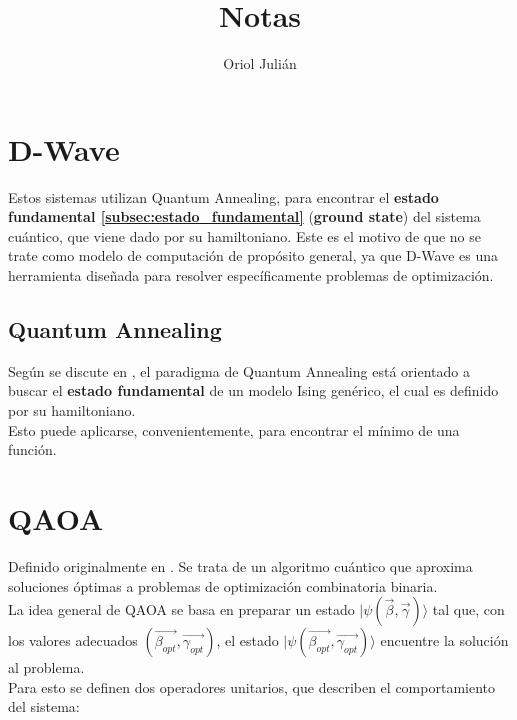 \documentclass{article}
\title{Notas}
\author{Oriol Julián}
\begin{document}
\maketitle{}
\tableofcontents{}

\newpage
\section{D-Wave}
\label{sec:dwave}

Estos sistemas utilizan Quantum Annealing, para encontrar el \textbf{estado fundamental \ref{subsec:estado_fundamental}} (\textbf{ground state}) del sistema cuántico, que viene dado por su hamiltoniano.
Este es el motivo de que no se trate como modelo de computación de propósito general, ya que D-Wave es una herramienta diseñada para resolver específicamente problemas de optimización.

\subsection{Quantum Annealing}
\label{sec:quantum_annealing}

Según se discute en \cite{quantum_annealing}, el paradigma de Quantum Annealing está orientado a buscar el \textbf{estado fundamental} de un modelo Ising genérico, el cual es definido por su hamiltoniano.
\\ Esto puede aplicarse, convenientemente, para encontrar el mínimo de una función.

\newpage
\section{QAOA}
\label{sec:qaoa}

Definido originalmente en \cite{qaoa_paper_original}. Se trata de un algoritmo cuántico que aproxima soluciones óptimas a problemas de optimización combinatoria binaria.
\\ La idea general de QAOA se basa en preparar un estado \(\lvert \psi(\vec{\beta}, \vec{\gamma})\rangle\) tal que, con los valores adecuados \( (\vec{\beta_{opt}}, \vec{\gamma_{opt}}) \), el estado \(\lvert\psi(\vec{\beta_{opt}}, \vec{\gamma_{opt}})\rangle\) encuentre la solución al problema.
\\ Para esto se definen dos operadores unitarios, que describen el comportamiento del sistema:
\end{document}
